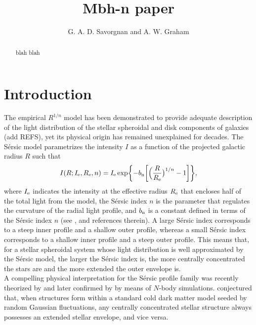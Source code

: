 \documentclass[preprint2]{emulateapj}
\begin{document}
\title{Mbh-n paper}


\author{G. A. D. Savorgnan and A. W. Graham}


\begin{abstract}
blah blah
\end{abstract}




\section{Introduction}
The empirical \cite{sersic1963,sersic1968} $R^{1/n}$ model has been demonstrated to provide adequate description 
of the light distribution of the stellar spheroidal and disk components of galaxies (add REFS), 
yet its physical origin has remained unexplained for decades. 
The S\'ersic model parametrizes the intensity $I$ as a function of the projected galactic radius $R$ such that
\begin{equation}
I(R; I_{\rm e},R_{\rm e},n) = I_{\rm e} \exp \biggl \{ -b_{\rm n} \biggl [ \Bigl (\frac{R}{R_{\rm e}} \bigr )^{1/n} -1 \biggr ] \biggr \}, 
\end{equation}
where $I_{\rm e}$ indicates the intensity at the effective radius $R_{\rm e}$ that encloses half of the total light from the model, 
the S\'ersic index $n$ is the parameter that regulates the curvature of the radial light profile, 
and $b_{\rm n}$ is a constant defined in terms of the S\'ersic index $n$ (see \citealt{grahamdriver2005}, and references therein). 
A large S\'ersic index corresponds to a steep inner profile and a shallow outer profile, 
whereas a small S\'ersic index corresponds to a shallow inner profile and a steep outer profile. 
This means that, for a stellar spheroidal system whose light distribution is well approximated by the S\'ersic model, 
the larger the S\'ersic index is, the more centrally concentrated the stars are and the more extended the outer envelope is. \\
A compelling physical interpretation for the S\'ersic profile family was recently theorized by \cite{cen2014} 
and later confirmed by \cite{nipoti2015} by means of $N$-body simulations. 
\cite{cen2014} conjectured that, when structures form within a standard cold dark matter model seeded by random Gaussian fluctuations, 
any centrally concentrated stellar structure always possesses an extended stellar envelope, and vice versa. 
\end{document}
